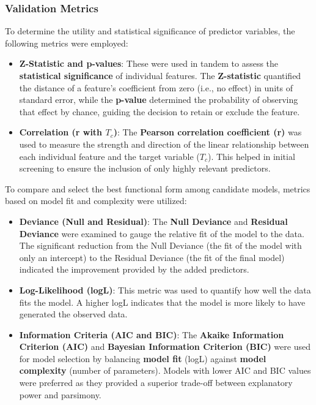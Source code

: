 \documentclass[conference]{IEEEtran}
\begin{document}
\subsubsection{\textbf{Validation Metrics}}
To determine the utility and statistical significance of predictor variables, the following metrics were employed:
\begin{itemize}
	\item \textbf{Z-Statistic and p-values}: These were used in tandem to assess the \textbf{statistical significance} of individual features. The \textbf{Z-statistic} quantified the distance of a feature's coefficient from zero (i.e., no effect) in units of standard error, while the \textbf{p-value} determined the probability of observing that effect by chance, guiding the decision to retain or exclude the feature.
	\item \textbf{Correlation (r with $T_c$)}: The \textbf{Pearson correlation coefficient (r)} was used to measure the strength and direction of the linear relationship between each individual feature and the target variable ($T_c$). This helped in initial screening to ensure the inclusion of only highly relevant predictors.\\
\end{itemize}

To compare and select the best functional form among candidate models, metrics based on model fit and complexity were utilized:
\begin{itemize}
	\item \textbf{Deviance (Null and Residual)}: The \textbf{Null Deviance} and \textbf{Residual Deviance} were examined to gauge the relative fit of the model to the data. The significant reduction from the Null Deviance (the fit of the model with only an intercept) to the Residual Deviance (the fit of the final model) indicated the improvement provided by the added predictors.
	\item \textbf{Log-Likelihood (logL)}: This metric was used to quantify how well the data fits the model. A higher logL indicates that the model is more likely to have generated the observed data.
	\item \textbf{Information Criteria (AIC and BIC)}: The \textbf{Akaike Information Criterion (AIC)} and \textbf{Bayesian Information Criterion (BIC)} were used for model selection by balancing \textbf{model fit} (logL) against \textbf{model complexity} (number of parameters). Models with lower AIC and BIC values were preferred as they provided a superior trade-off between explanatory power and parsimony.\\
\end{itemize}
\end{document}
